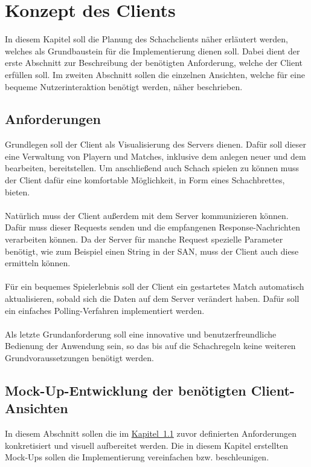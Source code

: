 
\chapter{Konzept des Clients}
In diesem Kapitel soll die Planung des Schachclients näher erläutert werden, welches als Grundbaustein für die Implementierung dienen soll. Dabei dient der erste Abschnitt zur Beschreibung der benötigten Anforderung, welche der Client erfüllen soll. Im zweiten Abschnitt sollen die einzelnen Ansichten, welche für eine bequeme Nutzerinteraktion benötigt werden, näher beschrieben. 

\section{Anforderungen}\label{sec:anforderungenClient}
Grundlegen soll der Client als Visualisierung des Servers dienen. Dafür soll dieser eine Verwaltung von Playern und Matches, inklusive dem anlegen neuer und dem bearbeiten, bereitstellen. Um anschließend auch Schach spielen zu können muss der Client dafür eine komfortable Möglichkeit, in Form eines Schachbrettes, bieten.\\
\\
Natürlich muss der Client außerdem mit dem Server kommunizieren können. Dafür muss dieser Requests senden und die empfangenen Response-Nachrichten verarbeiten können. Da der Server für manche Request spezielle Parameter benötigt, wie zum Beispiel einen String in der \gls{SAN}, muss der Client auch diese ermitteln können.\\
\\
Für ein bequemes Spielerlebnis soll der Client ein gestartetes Match automatisch aktualisieren, sobald sich die Daten auf dem Server verändert haben. Dafür soll ein einfaches Polling-Verfahren implementiert werden.\\
\\ 
Als letzte Grundanforderung soll eine innovative und benutzerfreundliche Bedienung der Anwendung sein, so das bis auf die Schachregeln keine weiteren Grundvoraussetzungen benötigt werden.

\section{Mock-Up-Entwicklung der benötigten Client-Ansichten}\label{sec:views}
In diesem Abschnitt sollen die im \hyperref[sec:anforderungenClient]{Kapitel~\ref{sec:anforderungenClient}} zuvor definierten Anforderungen konkretisiert und visuell aufbereitet werden. Die in diesem Kapitel erstellten Mock-Ups sollen die Implementierung vereinfachen bzw. beschleunigen.

